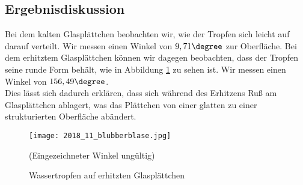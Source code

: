 \documentclass{scrartcl}
\begin{document}
\subsection{Ergebnisdiskussion}
Bei dem kalten Glasplättchen beobachten wir, wie der Tropfen sich leicht auf darauf verteilt. Wir messen einen Winkel von $9,71\degree$ zur Oberfläche.
Bei dem erhitztem Glasplättchen können wir dagegen beobachten, dass der Tropfen seine runde Form behält, wie in Abbildung \ref{fig:V4} zu sehen ist. Wir messen einen Winkel von $156,49\degree$.\\
Dies lässt sich dadurch erklären, dass sich während des Erhitzens Ruß am Glasplättchen ablagert, was das Plättchen von einer glatten zu einer strukturierten Oberfläche abändert.  
\begin{figure}[H]
  \centering
    \texttt{[image: 2018\_11\_blubberblase.jpg]}
  \caption{Wassertropfen auf erhitzten Glasplättchen}
  (Eingezeichneter Winkel ungültig)
  \label{fig:V4}
\end{figure}
\end{document}
